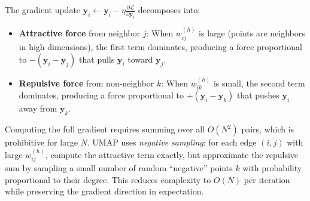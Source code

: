 \begin{corollary}
  The gradient update $\mathbf{y}_i \leftarrow \mathbf{y}_i - \eta \frac{\partial \mathcal{L}}{\partial \mathbf{y}_i}$ decomposes into:
  \begin{itemize}
    \item \textbf{Attractive force} from neighbor $j$: When $w_{ij}^{(h)}$ is large (points are neighbors in high dimensions), the first term dominates, producing a force proportional to $-(\mathbf{y}_i - \mathbf{y}_j)$ that pulls $\mathbf{y}_i$ toward $\mathbf{y}_j$.
    \item \textbf{Repulsive force} from non-neighbor $k$: When $w_{ik}^{(h)}$ is small, the second term dominates, producing a force proportional to $+(\mathbf{y}_i - \mathbf{y}_k)$ that pushes $\mathbf{y}_i$ away from $\mathbf{y}_k$.
  \end{itemize}
\end{corollary}

\begin{remark}
  Computing the full gradient requires summing over all $O(N^2)$ pairs, which is prohibitive for large $N$. UMAP uses \emph{negative sampling}: for each edge $(i,j)$ with large $w_{ij}^{(h)}$, compute the attractive term exactly, but approximate the repulsive sum by sampling a small number of random ``negative'' points $k$ with probability proportional to their degree. This reduces complexity to $O(N)$ per iteration while preserving the gradient direction in expectation.
\end{remark}


